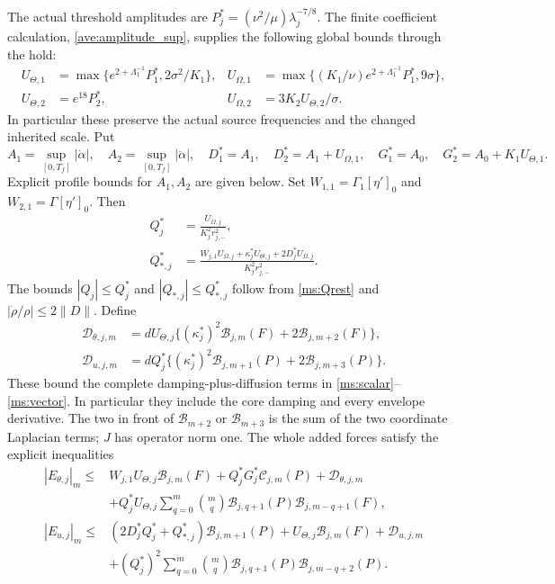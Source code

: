 The actual threshold amplitudes are
$P_j^*=(\nu^2/\mu)\lambda_j^{-7/8}$. The finite coefficient
calculation, \eqref{ave:amplitude_sup}, supplies the following global
bounds through the hold:
\begin{align}
 U_{\Theta,1}&=\max\{e^{2+\Lambda_1^{-1}}P_1^*,2\sigma^2/K_1\},
 &U_{\Omega,1}&=\max\{(K_1/\nu)e^{2+\Lambda_1^{-1}}P_1^*,9\sigma\},
 \nonumber\\
 U_{\Theta,2}&=e^{18}P_2^*,
 &U_{\Omega,2}&=3K_2U_{\Theta,2}/\sigma.
 \label{ms:amplitudebounds}
\end{align}
In particular these preserve the actual source frequencies and
the changed inherited scale. Put
\[
 A_1=\sup_{[0,T_f]}|\dot\alpha|,\quad
 A_2=\sup_{[0,T_f]}|\ddot\alpha|,\quad
 D_1^*=A_1,\quad D_2^*=A_1+U_{\Omega,1},\quad
 G_1^*=A_0,\quad G_2^*=A_0+K_1U_{\Theta,1}.
\]
Explicit profile bounds for $A_1,A_2$ are given below. Set
$W_{1,1}=\Gamma_1[\eta']_0$ and
$W_{2,1}=\Gamma[\eta']_0$. Then
\begin{align}
 Q_j^*&=\frac{U_{\Omega,j}}{K_j^2r_{j,-}^2},\nonumber\\
 Q_{*,j}^*&=\frac{W_{j,1}U_{\Omega,j}
          +\kappa_j^* U_{\Theta,j}+2D_j^*U_{\Omega,j}}
                       {K_j^2r_{j,-}^2}.
 \label{ms:Qbounds}
\end{align}
The bounds $|Q_j|\leq Q_j^*$ and $|Q_{*,j}|\leq Q_{*,j}^*$
follow from \eqref{ms:Qrest} and
$|\dot\rho/\rho|\leq2\|D\|$. Define
\begin{align}
 \mathcal D_{\theta,j,m}
 &=dU_{\Theta,j}\{(\kappa_j^*)^2\mathcal B_{j,m}(F)
                                      +2\mathcal B_{j,m+2}(F)\},\nonumber\\
 \mathcal D_{u,j,m}
 &=dQ_j^*\{(\kappa_j^*)^2\mathcal B_{j,m+1}(P)
                                      +2\mathcal B_{j,m+3}(P)\}.
 \label{ms:diffnorm}
\end{align}
These bound the complete damping-plus-diffusion terms in
\eqref{ms:scalar}--\eqref{ms:vector}. In particular they include
the core damping and every envelope derivative. The two in front
of $\mathcal B_{m+2}$ or $\mathcal B_{m+3}$ is the sum of the
two coordinate Laplacian terms; $J$ has operator norm one.
The whole added forces satisfy the explicit inequalities
\begin{align}
 |E_{\theta,j}|_m\leq{}&W_{j,1}U_{\Theta,j}\mathcal B_{j,m}(F)
   +Q_j^*G_j^*\mathcal C_{j,m}(P)+\mathcal D_{\theta,j,m}\nonumber\\
 &+Q_j^*U_{\Theta,j}\sum_{q=0}^m\binom mq
        \mathcal B_{j,q+1}(P)\mathcal B_{j,m-q+1}(F),
 \label{ms:fullscalarnorm}\\
 |E_{u,j}|_m\leq{}&(2D_j^*Q_j^*+Q_{*,j}^*)\mathcal B_{j,m+1}(P)
                  +U_{\Theta,j}\mathcal B_{j,m}(F)+\mathcal D_{u,j,m}
 \nonumber\\
 &+(Q_j^*)^2\sum_{q=0}^m\binom mq
            \mathcal B_{j,q+1}(P)\mathcal B_{j,m-q+2}(P).
 \label{ms:fullvectornorm}
\end{align}
